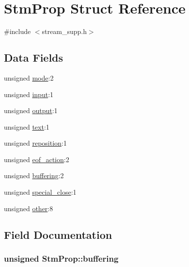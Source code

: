\hypertarget{structStmProp}{}\section{Stm\+Prop Struct Reference}
\label{structStmProp}


{\ttfamily \#include $<$stream\+\_\+supp.\+h$>$}

\subsection*{Data Fields}
\begin{DoxyCompactItemize}
\item 
unsigned \hyperlink{structStmProp_a8a2ef413513d1963d66e2f490b6b83b4}{mode}\+:2
\item 
unsigned \hyperlink{structStmProp_a600c8a2fc85ea28e18dd45a1bfdbb039}{input}\+:1
\item 
unsigned \hyperlink{structStmProp_ac00a5a24dbbfeece3814be64cc7014d6}{output}\+:1
\item 
unsigned \hyperlink{structStmProp_ac19d8844240a9c3059104f8afd135834}{text}\+:1
\item 
unsigned \hyperlink{structStmProp_a812b9e484fea9756ace87645f847f6f4}{reposition}\+:1
\item 
unsigned \hyperlink{structStmProp_a04e464b0b01bd6e61e4752dc40264126}{eof\+\_\+action}\+:2
\item 
unsigned \hyperlink{structStmProp_ad4122d8a077810116d89eb216c24e642}{buffering}\+:2
\item 
unsigned \hyperlink{structStmProp_a77078202569393e5ac5b40c0e3b4e8af}{special\+\_\+close}\+:1
\item 
unsigned \hyperlink{structStmProp_a53b858c5848ca920087838eb02faf75f}{other}\+:8
\end{DoxyCompactItemize}


\subsection{Field Documentation}
\subsubsection[{\texorpdfstring{buffering}{buffering}}]{\setlength{\rightskip}{0pt plus 5cm}unsigned Stm\+Prop\+::buffering}\hypertarget{structStmProp_ad4122d8a077810116d89eb216c24e642}{}\label{structStmProp_ad4122d8a077810116d89eb216c24e642}
